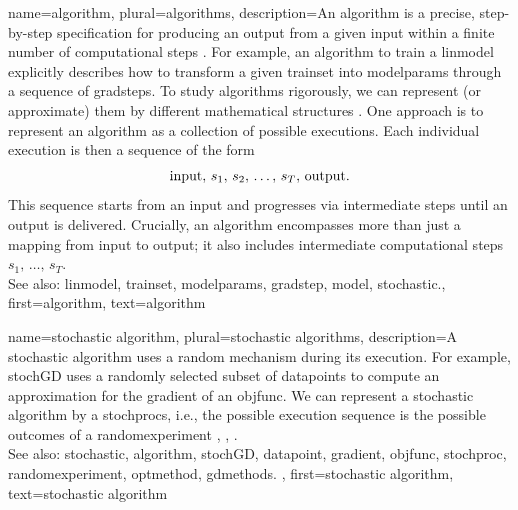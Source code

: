 {name={algorithm}, plural={algorithms},
 	description={An algorithm is a precise, step-by-step specification for 
  		producing an output from a given input within a finite number of computational steps \cite{Cormen:2022aa}. 
    		For example, an algorithm to train a \gls{linmodel} explicitly describes how to 
		transform a given \gls{trainset} into \gls{modelparams} through a sequence of \glspl{gradstep}. 
    		To study algorithms rigorously, we can represent (or approximate) them by different mathematical structures \cite{Sipser2013}. 
     		One approach is to represent an algorithm as a collection of possible executions. Each individual 
     		execution is then a sequence of the form $${\rm input}, \,s_1, \,s_2, \,\ldots, \,s_T, \,{\rm output}.$$ This sequence 
     		starts from an input and progresses via intermediate steps until an output is delivered. Crucially, an algorithm 
     		encompasses more than just a mapping from input to output; it also includes intermediate computational 
     		steps $s_1, \,\ldots, \,s_T$.
				\\ 
		See also: \gls{linmodel}, \gls{trainset}, \gls{modelparams}, \gls{gradstep}, \gls{model}, \gls{stochastic}.},
	first={algorithm},
	text={algorithm} 
}

{name={stochastic algorithm}, 
 plural={stochastic algorithms},
	description={A \gls{stochastic} \gls{algorithm} uses a random mechanism 
		during its execution. For example, \gls{stochGD} uses a randomly selected subset of \glspl{datapoint} 
		to compute an approximation for the \gls{gradient} of an \gls{objfunc}. We can represent a 
		\gls{stochastic} \gls{algorithm} by a \glspl{stochproc}, i.e., the possible execution sequence is the possible outcomes of 
		a \gls{randomexperiment} \cite{BertsekasProb}, \cite{RandomizedAlgos}, \cite{Gallager13}.		
		\\ 
		See also: \gls{stochastic}, \gls{algorithm}, \gls{stochGD}, \gls{datapoint}, \gls{gradient}, \gls{objfunc}, \gls{stochproc}, 
		\gls{randomexperiment}, \gls{optmethod}, \gls{gdmethods}. },
	first={stochastic algorithm},
	text={stochastic algorithm} 
}

